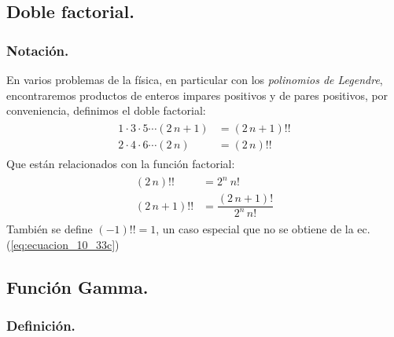 \subsection{Doble factorial.}

\subsubsection{Notación.}

En varios problemas de la física, en particular con los \emph{polinomios de Legendre}, encontraremos productos de enteros impares positivos y de pares positivos, por conveniencia, definimos el doble factorial:
\begin{align}
\begin{aligned}
1 \cdot 3 \cdot 5 \cdots (2 \, n+1) &= (2 \, n+1) !! \\
2 \cdot 4 \cdot 6 \cdots (2 \, n) &= (2 \, n) !!
\end{aligned}
\label{eq:ecuacion_10_33b}
\end{align}
Que están relacionados con la función factorial:
\begin{align}
\begin{aligned}
(2 \, n)!! &=  2^{n} \: n! \\[1em]
(2 \, n+1)!! &= \dfrac{(2 \, n+1)!}{2^{n} \, n!}
\end{aligned}
\label{eq:ecuacion_10_33c}
\end{align}
También se define $(-1)!! = 1$, un caso especial que no se obtiene de la ec. (\ref{eq:ecuacion_10_33c})

\subsection{Función Gamma.}

\subsubsection{Definición.}

